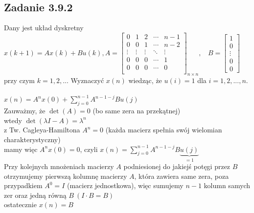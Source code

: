 \subsection*{Zadanie 3.9.2} {\color{darkgray}
	Dany jest układ dyskretny\\
	$x(k+1)=Ax(k)+Bu(k), A=\left[ \begin{array}{ccccc}   
		 0&1&2&\cdots&n-1 \\
		 0&0&1&\cdots&n-2  \\
		 \vdots&\vdots&\vdots&\ddots&\vdots  \\
		 0&0&0&\cdots&1  \\
		 0&0&0&\cdots&0  \\
	\end{array}\right]_{n \times n}, \ \ \ \ B=\left[\begin{array}{c}   
		1 \\ 0 \\ \vdots \\ 0 \\ 0
	\end{array}\right]$\\
	przy czym $k=1,2,...$ Wyznaczyć $x(n)$ wiedząc, że $u(i)=1$ dla $i=1,2,...,n$.
}\\\\
$x(n)=A^nx(0)+\sum_{j=0}^{n-1}A^{n-1-j}Bu(j)$\\
Zauważmy, że $\det (A) = 0$ (bo same zera na przekątnej)\\
wtedy $\det(\lambda I-A)=\lambda^n$\\
z Tw. Cagleya-Hamiltona $A^n=0$ (każda macierz spełnia swój wielomian charakterystyczny)\\
mamy więc $A^nx(0)=0$, czyli $x(n)=\sum_{j=0}^{n-1}A^{n-1-j}B\underbrace{u(j)}_{=1}$\\
Przy kolejnych mnożeniach macierzy $A$ podniesionej do jakiejś potęgi przez $B$ otrzymujemy pierwszą kolumnę macierzy $A$, która zawiera same zera, poza przypadkiem $A^0=I$ (macierz jednostkowa), więc sumujemy $n-1$ kolumn samych zer oraz jedną równą $B \  (I\cdot B=B)$\\
ostatecznie $\boxed{x(n)=B}$

\pagebreak
